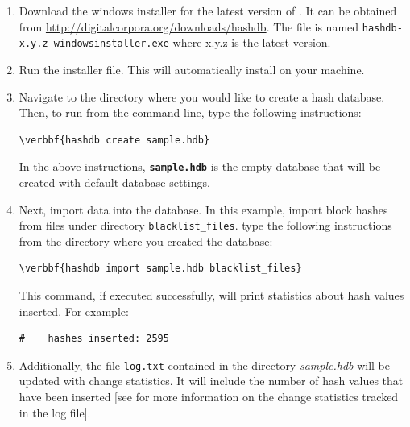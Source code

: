 \documentclass[11pt,fleqn]{article} %
\begin{document}
\begin{enumerate}
\item Download the windows installer for the latest version of \hdb. It can be obtained from \url{http://digitalcorpora.org/downloads/hashdb}. The file is named \texttt{hashdb-x.y.z-windowsinstaller.exe} where x.y.z is the latest version. 

\item Run the installer file. This will automatically install \hdb on your machine.

\item Navigate to the directory where you would like to create a hash database. Then, to run \hdb from the command line, type the following instructions: 
\begin{Verbatim}[commandchars=\\\{\}]
\verbbf{hashdb create sample.hdb}
\end{Verbatim} 

In the above instructions, \texttt{\textbf{sample.hdb}} is the empty database that will be created with default database settings.

\item Next, import data into the database. In this example, import
block hashes from files under directory \texttt{blacklist\_files}.
type the following instructions from the directory where you created the database:
\begin{Verbatim}[commandchars=\\\{\}]
\verbbf{hashdb import sample.hdb blacklist_files}
\end{Verbatim} 
This command, if executed successfully, will print statistics about hash values inserted. For example: 
\begingroup
\footnotesize
\begin{Verbatim}[fontfamily=courier]
#    hashes inserted: 2595
\end{Verbatim}
\endgroup
\item Additionally, the file \texttt{log.txt} contained in the directory \textit{sample.hdb} will be updated with change statistics. It will include the number of hash values that have been inserted [see \textbf{} for more information on the change statistics tracked in the log file].
 

\end{enumerate}

\newpage
\end{document}
